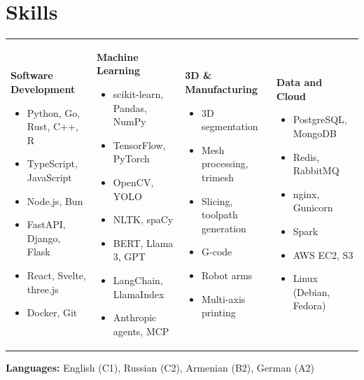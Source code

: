\documentclass{ExpressiveResume}
\begin{document}


\section{Skills}
\noindent\begin{tabularx}{\textwidth}{@{}X@{}X@{}X@{}X@{}}
\textbf{Software Development}
\begin{itemize}
    \item Python, Go, Rust, C++, R
    \item TypeScript, JavaScript
    \item Node.js, Bun
    \item FastAPI, Django, Flask
    \item React, Svelte, three.js
    \item Docker, Git
\end{itemize}
&
\textbf{Machine Learning}
\begin{itemize}
    \item scikit-learn, Pandas, NumPy
    \item TensorFlow, PyTorch
    \item OpenCV, YOLO
    \item NLTK, spaCy
    \item BERT, Llama 3, GPT
    \item LangChain, LlamaIndex
    \item Anthropic agents, MCP
\end{itemize}
&
\textbf{3D \& Manufacturing}
\begin{itemize}
    \item 3D segmentation
    \item Mesh processing, trimesh
    \item Slicing, toolpath generation
    \item G-code
    \item Robot arms
    \item Multi-axis printing
\end{itemize}
&
\textbf{Data and Cloud}
\begin{itemize}
    \item PostgreSQL, MongoDB
    \item Redis, RabbitMQ
    \item nginx, Gunicorn
    \item Spark
    \item AWS EC2, S3
    \item Linux (Debian, Fedora)
\end{itemize}
\end{tabularx}
\par\vspace{2pt}\noindent\textbf{Languages:} English (C1), Russian (C2), Armenian (B2), German (A2)
\end{document}
